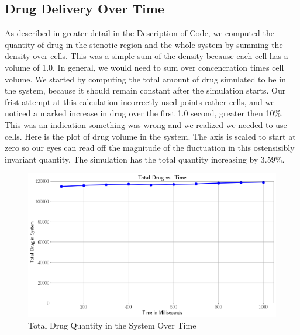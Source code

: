 \documentclass[11pt]{article} %
\begin{document}
\subsection{Drug Delivery Over Time}
As described in greater detail in the Description of Code, we computed the quantity of drug
in the stenotic region and the whole system by summing the density over cells.
This was a simple sum of the density because each cell has a volume of 1.0.
In general, we would need to sum over concencration times cell volume.
We started by computing the total amount of drug simulated to be in the system,
because it should remain constant after the simulation starts.
Our frist attempt at this calculation incorrectly used points rather cells, and we noticed
 a marked increase in drug over the first 1.0 second, greater then 10\%.
This was an indication something was wrong and we realized we needed to use cells.
Here is the plot of drug volume in the system.  
The axis is scaled to start at zero so our eyes can read off the magnitude of the fluctuation
in this ostensisibly invariant quantity.  
The simulation has the total quantity increasing by 3.59\%.
\begin{figure}[h!]
\centering
\includegraphics[width=1.00\textwidth]{drug_tot.png}
\caption{Total Drug Quantity in the System Over Time}
\end{figure}
\end{document}
